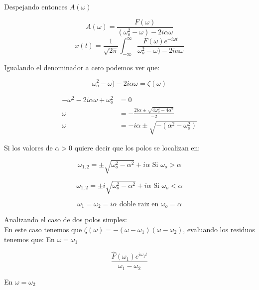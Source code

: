 \documentclass[11pt]{report}
\theoremstyle{plain}
\theoremstyle{definition}
\begin{document}
Despejando entonces $A(\omega)$

\begin{equation*}
	A(\omega) = \frac{F(\omega)}{(\omega^2_o -\omega)-2i\alpha\omega}
\end{equation*}
\begin{equation*}
	x(t)=\frac{1}{\sqrt{2\pi}}\int_{-\infty}^\infty \frac{F(\omega)e^{-i\omega t}}{\omega^2_o -\omega)-2i\alpha\omega}
\end{equation*}

Igualando el denominador a cero podemos ver que:

\begin{equation*}
	\omega^2_o -\omega)-2i\alpha\omega = \zeta (\omega)
\end{equation*}

\begin{align*}
	-\omega^2 -2i\alpha\omega + \omega^2_o &=0\\
	\omega &= -\frac{2i\alpha \pm\sqrt{4\omega^2_o - 4\alpha^2}}{-2}\\
	\omega &= -i\alpha \pm \sqrt{-(\alpha^2-\omega^2_o)}
\end{align*}

Si los valores de $\alpha>0$ quiere decir que los polos se localizan en:

\begin{equation*}
	\omega_{1,2} = \pm \sqrt{\omega^2_o-\alpha^2}+i\alpha \text{ Si $\omega_o > \alpha$}
\end{equation*}

\begin{equation*}
	\omega_{1,2} = \pm i\sqrt{\omega^2_o-\alpha^2}+i\alpha \text{ Si $\omega_o < \alpha$}
\end{equation*}

\begin{equation*}
	\omega_{1} = \omega_{2} = i\alpha \text{ doble raiz en $\omega_o = \alpha$}
\end{equation*}

Analizando el caso de dos polos simples:\\
En este caso tenemos que $\zeta(\omega) = -(\omega - \omega_1)(\omega-\omega_2)$, evaluando los residuos tenemos que:
En $\omega = \omega_1$

\begin{equation*}
	\frac{\hat F (\omega_1) e^{i\omega_1 t}}{\omega_1-\omega_2}
\end{equation*}

En $\omega = \omega_2$
\end{document}
